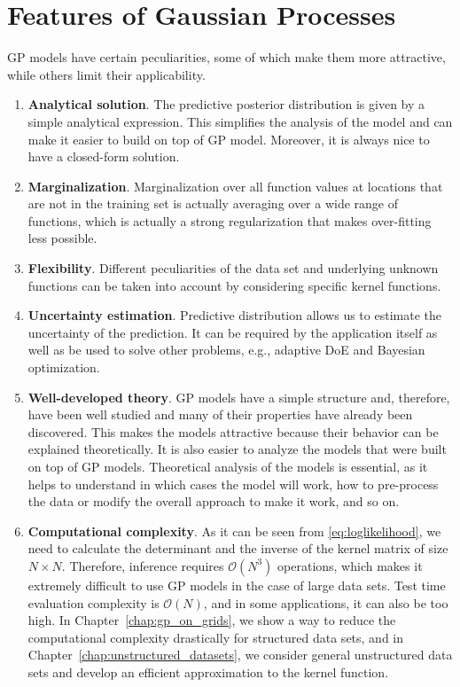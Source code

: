 \section{Features of Gaussian Processes}
GP models have certain peculiarities, some of which make them more attractive, while others limit their applicability.
\begin{enumerate}
    \item \textbf{Analytical solution}.
      The predictive posterior distribution is given by a simple analytical expression.
      This simplifies the analysis of the model and can make it easier to build on top of
      GP model.
      Moreover, it is always nice to have a closed-form solution.

    \item \textbf{Marginalization}.
      Marginalization over all function values at locations that are not in the training
      set is actually averaging over a wide range of functions, which
      is actually a strong regularization that makes over-fitting less possible.

    \item \textbf{Flexibility}.
      Different peculiarities of the data set and underlying unknown functions
      can be taken into account by considering specific kernel functions.

    \item \textbf{Uncertainty estimation}.
      Predictive distribution allows us to estimate the uncertainty of the prediction.
      It can be required by the application itself as well as be used to solve other
      problems, e.g., adaptive DoE and Bayesian optimization.

    \item \textbf{Well-developed theory}.
      GP models have a simple structure and, therefore, have been
      well studied and many of their properties have already been discovered.
      This makes the models attractive because their behavior can be explained
      theoretically.
      It is also easier to analyze the models that were built on top of GP models.
      Theoretical analysis of the models is essential, as it helps to understand
      in which cases the model will work, how to pre-process the data
      or modify the overall approach to make it work, and so on.

    \item \textbf{Computational complexity}.
      As it can be seen from \eqref{eq:loglikelihood}, we need to calculate the determinant
      and the inverse of the kernel matrix of size $N \times N$.
      Therefore, inference requires $\mathcal{O}(N^3)$ operations, which
      makes it extremely difficult to use GP models in the case of large data sets.
      Test time evaluation complexity is $\mathcal{O}(N)$, and in some applications, it can also
      be too high.
      In Chapter~\ref{chap:gp_on_grids}, we show a way to reduce the computational complexity drastically
       for structured data sets,
      and in Chapter~\ref{chap:unstructured_datasets}, we consider general unstructured
      data sets and develop an efficient approximation to the kernel function.


\end{enumerate}
